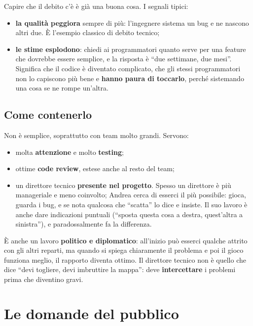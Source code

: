 Capire che il debito c'è è già una buona cosa. I segnali tipici:
\begin{itemize}
  \item \textbf{la qualità peggiora} sempre di più: l'ingegnere sistema un bug e
        ne nascono altri due. È l'esempio classico di debito tecnico;
  \item \textbf{le stime esplodono}: chiedi ai programmatori quanto serve per una
        feature che dovrebbe essere semplice, e la risposta è ``due settimane, due
        mesi''. Significa che il codice è diventato complicato, che gli stessi
        programmatori non lo capiscono più bene e \textbf{hanno paura di
        toccarlo}, perché sistemando una cosa se ne rompe un'altra.
\end{itemize}

\subsection{Come contenerlo}

Non è semplice, soprattutto con team molto grandi. Servono:
\begin{itemize}
  \item molta \textbf{attenzione} e molto \textbf{testing};
  \item ottime \textbf{code review}, estese anche al resto del team;
  \item un direttore tecnico \textbf{presente nel progetto}. Spesso un direttore è
        più manageriale e meno coinvolto; Andrea cerca di esserci il più possibile:
        gioca, guarda i bug, e se nota qualcosa che ``scatta'' lo dice e
        insiste. Il suo lavoro è anche dare indicazioni puntuali (``sposta questa
        cosa a destra, quest'altra a sinistra''), e paradossalmente fa la
        differenza.
\end{itemize}
È anche un lavoro \textbf{politico e diplomatico}: all'inizio può esserci
qualche attrito con gli altri reparti, ma quando si spiega chiaramente il problema
e poi il gioco funziona meglio, il rapporto diventa ottimo. Il direttore tecnico
non è quello che dice ``devi togliere, devi imbruttire la mappa'': deve
\textbf{intercettare} i problemi prima che diventino gravi.

\section{Le domande del pubblico}
\label{sec:c3-2-domande}

